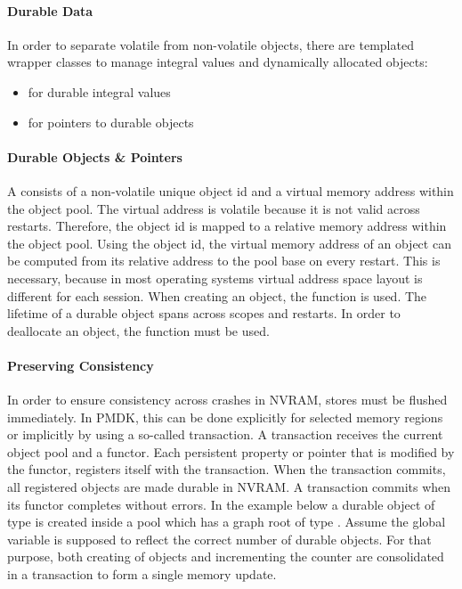 \paragraph{Durable Data}

In order to separate volatile from non-volatile objects, there are templated
wrapper classes to manage integral values and dynamically allocated objects:

\begin{itemize}
    \item {} for durable integral values
    \item {} for pointers to durable objects
\end{itemize}

\paragraph{Durable Objects \& Pointers}

A  consists of a non-volatile unique object id and a
virtual memory address within the object pool. The virtual address is volatile
because it is not valid across restarts. Therefore, the object id is mapped to a
relative memory address within the object pool. Using the object id, the virtual
memory address of an object can be computed from its relative address to the
pool base on every restart. This is necessary, because in most operating systems
virtual address space layout is different for each session. When creating an
object, the function  is used. The lifetime of
a durable object spans across scopes and restarts. In order to deallocate an
object, the function  must be used.

\paragraph{Preserving Consistency}

In order to ensure consistency across crashes in NVRAM, stores must be flushed
immediately. In PMDK, this can be done explicitly for selected memory regions or
implicitly by using a so-called transaction. A transaction receives the current
object pool and a functor. Each persistent property or pointer that is modified
by the functor, registers itself with the transaction. When the transaction
commits, all registered objects are made durable in NVRAM. A transaction commits
when its functor completes without errors. In the example below a durable object
of type  is created inside a pool which has a graph root of type
. Assume the global variable  is supposed to reflect
the correct number of durable objects. For that purpose, both creating of
objects and incrementing the counter are consolidated in a transaction to form a
single memory update.

